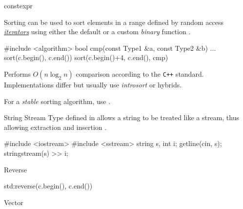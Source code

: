 \documentclass{cognito}
\begin{document}
\begin{note}{constexpr}
\end{note}


\begin{note}{Sorting}
	 can be used to sort elements in a range defined by random access \hyperref[note:Iterators]{\it iterators} \incode{[first, last)}
	using either the default  or a custom \emph{binary} function .
	\begin{largecode}
 #include <algorithm>
 bool cmp(const Type1 &a, const Type2 &b) { ... }
 sort(c.begin(), c.end())
 sort(c.begin()+4, c.end(), cmp)
	\end{largecode}
	Performs $O(n \log_2 n)$ comparison according to the {\tt C++} standard. Implementations differ
	but usually use {\it introsort} or hybrids.
	\begin{remark} For a \emph{stable} sorting algorithm, use . \end{remark} \vspace{-5pt}
\end{note}

\begin{note}{String Stream}
	Type  defined in  allows
	a string to be treated like a stream, thus allowing extraction \incode{<<} and insertion \incode{>>}.
	\begin{largecode}
 #include <iostream>
 #include <sstream>
 string s, int i;
 getline(cin, s);
 stringstream(s) >> i;
	\end{largecode}
	\vspace{-5pt}
\end{note}


\begin{note}{Reverse}
	\begin{largecode}
 std:reverse(c.begin(), c.end())
 	\end{largecode}
\end{note}

\begin{note}{Vector}
\end{note}
\end{document}
